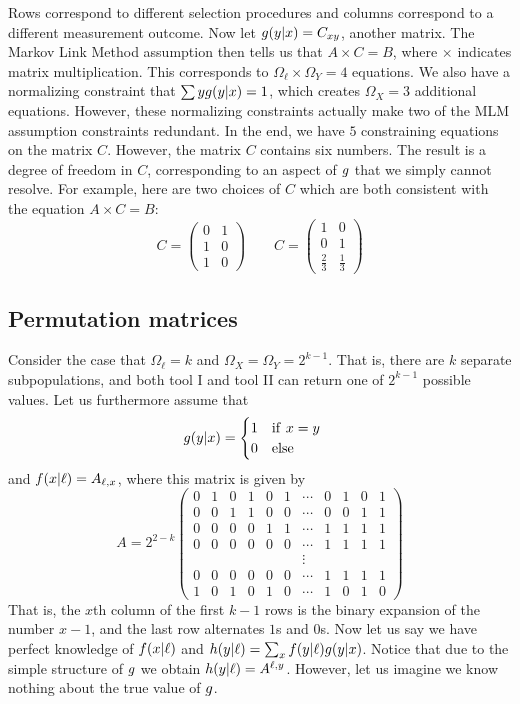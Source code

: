 Rows correspond to different selection procedures and columns correspond to a different measurement outcome.  Now let $g(y|x)=C_{x y}$, another matrix.  The Markov Link Method assumption then tells us that $A\times C=B$, where $\times$ indicates matrix multiplication.  This corresponds to $\Omega_\ell \times \Omega_Y = 4$ equations.  We also have a normalizing constraint that $\sum y g(y|x)=1$, which creates $\Omega_X=3$ additional equations.  However, these normalizing constraints actually make two of the MLM assumption constraints redundant.  In the end, we have $5$ constraining equations on the matrix $C$.  However, the matrix $C$ contains six numbers.  The result is a degree of freedom in $C$, corresponding to an aspect of $g$ that we simply cannot resolve.  For example, here are two choices of $C$ which are both consistent with the equation $A\times C=B$:
\[
C=\left(\begin{array}{cc}
0 & 1\\
1 & 0\\
1 & 0
\end{array}\right)\qquad C=\left(\begin{array}{cc}
1 & 0\\
0 & 1\\
\frac{2}{3} & \frac{1}{3}
\end{array}\right)
\]



\subsection{Permutation matrices}

Consider the case that $\Omega_\ell = k$ and $\Omega_X=\Omega_Y=2^{k-1}$.  That is, there are $k$ separate subpopulations, and both tool I and tool II can return one of $2^{k-1}$ possible values.  Let us furthermore assume that
\[
\pxy(y|x)=\begin{cases}1 \quad \mathrm{if}\ x=y\\0\quad \mathrm{else}\end{cases}
\]
and  $f(x|\ell)=A_{\ell,x}$, where this matrix is given by
\[
A=2^{2-k}\left(\begin{array}{ccccccccccc}
0 & 1 & 0 & 1 & 0 & 1 & \cdots & 0 & 1 & 0 & 1\\
0 & 0 & 1 & 1 & 0 & 0 & \cdots & 0 & 0 & 1 & 1\\
0 & 0 & 0 & 0 & 1 & 1 & \cdots & 1 & 1 & 1 & 1\\
0 & 0 & 0 & 0 & 0 & 0 & \cdots & 1 & 1 & 1 & 1\\
 &  &  &  &  &  & \vdots\\
0 & 0 & 0 & 0 & 0 & 0 & \cdots & 1 & 1 & 1 & 1\\
1 & 0 & 1 & 0 & 1 & 0 & \cdots & 1 & 0 & 1 & 0
\end{array}\right)
\]
That is, the $x$th column of the first $k-1$ rows is the binary expansion of the number $x-1$, and the last row alternates $1$s and $0$s.  Now let us say we have perfect knowledge of $f(x|\ell)$ and $h(y|\ell)=\sum_x f(y|\ell)g(y|x)$.  Notice that due to the simple structure of $g$ we obtain $h(y|\ell)=A^{\ell,y}$.  However, let us imagine we know nothing about the true value of $g$.  

